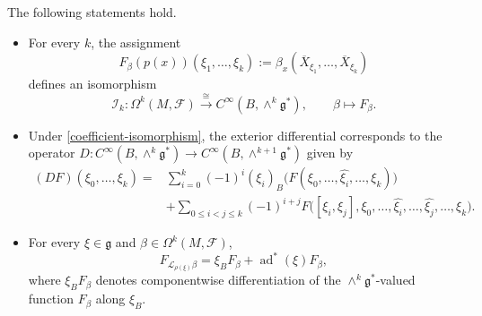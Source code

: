 \documentclass[10pt,a4paper]{amsart}
\begin{document}
\begin{lem}\label{coefficient-complex}
The following statements hold.
\begin{itemize}
\item[(a)] For every $k$, the assignment
\begin{equation}\label{coefficient-map}
F_\beta(p(x))(\xi_1,\dots,\xi_k)
:=
\beta_x(\overline X_{\xi_1},\dots,\overline X_{\xi_k})
\end{equation}
defines an isomorphism
\begin{equation}\label{coefficient-isomorphism}
\mathcal I_k:
\Omega^k(M,\mathcal F)
\xrightarrow{\;\cong\;}
C^\infty(B,\wedge^k\mathfrak g^*),
\qquad
\beta\longmapsto F_\beta.
\end{equation}

\item[(b)] Under \eqref{coefficient-isomorphism}, the exterior differential
corresponds to the operator
$
D:C^\infty(B,\wedge^k\mathfrak g^*)
\longrightarrow
C^\infty(B,\wedge^{k+1}\mathfrak g^*)$
given by
\begin{align}
(DF)(\xi_0,\dots,\xi_k)
={}&
\sum_{i=0}^k(-1)^i(\xi_i)_B
\bigl(
F(\xi_0,\dots,\widehat{\xi_i},\dots,\xi_k)
\bigr)
\nonumber\\
&+
\sum_{0\leq i<j\leq k}(-1)^{i+j}
F\bigl(
[\xi_i,\xi_j],
\xi_0,\dots,\widehat{\xi_i},\dots,
\widehat{\xi_j},\dots,\xi_k
\bigr).
\label{coefficient-differential}
\end{align}

\item[(c)] For every $\xi\in\mathfrak g$ and
$\beta\in\Omega^k(M,\mathcal F)$,
\begin{equation}\label{coefficient-lie-derivative}
F_{\mathcal L_{\rho(\xi)}\beta}
=
\xi_BF_\beta+\operatorname{ad}^*(\xi)F_\beta,
\end{equation}
where $\xi_BF_\beta$ denotes componentwise differentiation of the
$\wedge^k\mathfrak g^*$-valued function $F_\beta$ along $\xi_B$.
\end{itemize}
\end{lem}
\end{document}
